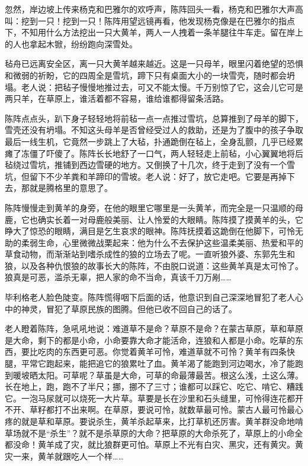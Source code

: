 \par 忽然，岸边坡上传来杨克和巴雅尔的欢呼声，陈阵回头一看，杨克和巴雅尔大声高叫：挖到一只！挖到一只！陈阵用望远镜再看，他发现杨克像是在巴雅尔的指点下，不知用什么方法挖出一只大黄羊，两人一人拽着一条羊腿往牛车走。留在岸上的人也拿起木锨，纷纷跑向深雪处。
\par 毡舟已远离安全区，离一只大黄羊越来越近。这是一只母羊，眼里闪着绝望的恐惧和微弱的祈盼，它的四周全是雪坑，蹄下只有桌面大小的一块雪壳，随时都会坍塌。老人说：把毡子慢慢地推过去，可又不能太慢。千万别惊了它，这会儿它可是两只羊，在草原上，谁活着都不容易，谁给谁都得留条活路。
\par 陈阵点点头，趴下身子轻轻地将前毡一点一点推过雪坑，总算推到了母羊的脚下，雪壳还没有坍塌。不知这头母羊是否曾经受过人的救助，还是为了腹中的孩子争取最后一线生机，它竟然一步跳上了大毡，扑通跪倒在毡上，全身乱颤，几乎已经累瘫了冻僵了吓傻了。陈阵长长地舒了一口气，两人轻轻走上前毡，小心翼翼地将后毡绕过雪坑，推铺到西边雪硬的地方。又倒换了十几次，终于走到了没有一个雪坑，但留下不少羊粪和羊蹄印的雪坡。老人说：好了，放它走吧。它要是再掉下去，那就是腾格里的意思了。
\par 陈阵慢慢走到黄羊的身旁，在他的眼里它哪里是一头黄羊，而完全是一只温顺的母鹿，它也确实长着一对母鹿般美丽、让人怜爱的大眼睛。陈阵摸了摸黄羊的头，它睁大了惊恐的眼睛，满目是乞生哀求的眼神。陈阵抚摸着这跪倒在他脚下，可怜无助的柔弱生命，心里微微战栗起来：他为什么不去保护这些温柔美丽、热爱和平的草食动物，而渐渐站到嗜杀成性的狼的立场去了呢。一直听狼外婆、东郭先生和狼，以及各种仇恨狼的故事长大的陈阵，不由脱口说道：这些黄羊真是太可怜了。狼真是可恶，滥杀无辜，把人家的命不当命，真该千刀万剐……
\par 毕利格老人脸色陡变。陈阵慌得咽下后面的话，他意识到自己深深地冒犯了老人心中的神灵，冒犯了草原民族的图腾。但他已收不回自己的话了。
\par 老人瞪着陈阵，急吼吼地说：难道草不是命？草原不是命？在蒙古草原，草和草原是大命，剩下的都是小命，小命要靠大命才能活命，连狼和人都是小命。吃草的东西，要比吃肉的东西更可恶。你觉着黄羊可怜，难道草就不可怜？黄羊有四条快腿，平常它跑起来，能把追它的狼累吐了血。黄羊渴了能跑到河边喝水，冷了能跑到暖坡晒太阳。可草呢？草虽是大命，可草的命最薄最苦。根这么浅，土这么薄。长在地上，跑，跑不了半尺；挪，挪不了三寸；谁都可以踩它、吃它、啃它、糟践它。一泡马尿就可以烧死一大片草。草要是长在沙里和石头缝里，可怜得连花都开不开、草籽都打不出来啊。在草原，要说可怜，就数草最可怜。蒙古人最可怜最心疼的就是草和草原。要说杀生，黄羊杀起草来，比打草机还厉害。黄羊群没命地啃草场就不是“杀生”？就不是杀草原的大命？把草原的大命杀死了，草原上的小命全都没命！黄羊成了灾，就比狼群更可怕。草原上不光有白灾、黑灾，还有黄灾。黄灾一来，黄羊就跟吃人一个样……
